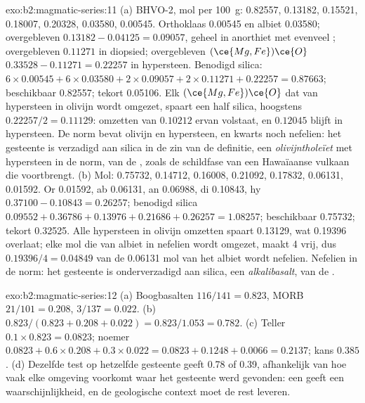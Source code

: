 \begin{solution}{exo:b2:magmatic-series:11}
(a) BHVO-2, mol per \qty{100}{g}:  0.82557,  0.13182, 
0.15521,  0.18007,  0.20328,  0.03580,  0.00545.
Orthoklaas 0.00545 en albiet 0.03580; overgebleven  $0.13182 - 0.04125 = 0.09057$,
geheel in anorthiet met evenveel ; overgebleven  $0.11271$ in diopsied;
overgebleven $(\ce{Mg,Fe})\ce{O}$ $0.33528 - 0.11271 = 0.22257$ in hypersteen. Benodigd
silica: $6\times0.00545 + 6\times0.03580 + 2\times0.09057 + 2\times0.11271 + 0.22257 =
0.87663$; beschikbaar 0.82557; tekort 0.05106. Elk $(\ce{Mg,Fe})\ce{O}$ dat van
hypersteen in olivijn wordt omgezet, spaart een half silica, hoogstens $0.22257/2 = 0.11129$: omzetten van
$0.10212$ ervan volstaat, en $0.12045$ blijft in hypersteen. De norm bevat olivijn
en hypersteen, en kwarts noch nefelien: het gesteente is verzadigd aan silica in de
zin van de definitie, een \emph{olivijntholeïet} met hypersteen in de norm, van de
, zoals de schildfase van een Hawaïaanse vulkaan die voortbrengt. (b) Mol: 0.75732, 0.14712, 0.16008, 0.21092, 0.17832, 0.06131,
0.01592. Or 0.01592, ab 0.06131, an 0.06988, di 0.10843, hy $0.37100 - 0.10843 =
0.26257$; benodigd silica $0.09552 + 0.36786 + 0.13976 + 0.21686 + 0.26257 = 1.08257$;
beschikbaar 0.75732; tekort 0.32525. Alle hypersteen in olivijn omzetten spaart
0.13129, wat 0.19396 overlaat; elke mol  die van albiet in nefelien wordt omgezet,
maakt 4  vrij, dus $0.19396/4 = 0.04849$
van de 0.06131 mol  van het albiet wordt nefelien. Nefelien in de norm: het
gesteente is onderverzadigd aan silica, een \emph{alkalibasalt}, van de .
\end{solution}

\begin{solution}{exo:b2:magmatic-series:12}
(a) Boogbasalten $116/141 = 0.823$, MORB $21/101 = 0.208$, 
$3/137 = 0.022$. (b) $0.823/(0.823 + 0.208 + 0.022) = 0.823/1.053 = 0.782$.
(c) Teller $0.1\times0.823 = 0.0823$; noemer $0.0823 + 0.6\times0.208 +
0.3\times0.022 = 0.0823 + 0.1248 + 0.0066 = 0.2137$; kans $0.385$. (d) Dezelfde
test op hetzelfde gesteente geeft 0.78 of 0.39, afhankelijk van hoe vaak elke omgeving
voorkomt waar het gesteente werd gevonden: een  geeft een waarschijnlijkheid, en de
geologische context moet de rest leveren.
\end{solution}

